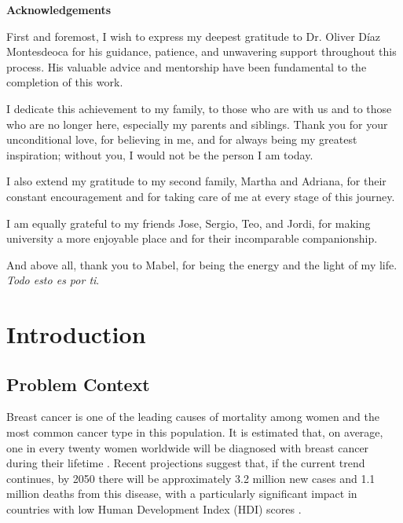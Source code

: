 \documentclass[a4paper,10pt]{book}
\begin{document}
\newpage
{}
\noindent \textbf{\large Acknowledgements}

First and foremost, I wish to express my deepest gratitude to Dr. Oliver Díaz Montesdeoca for his guidance, patience, and unwavering support throughout this process. His valuable advice and mentorship have been fundamental to the completion of this work.

I dedicate this achievement to my family, to those who are with us and to those who are no longer here, especially my parents and siblings. Thank you for your unconditional love, for believing in me, and for always being my greatest inspiration; without you, I would not be the person I am today.

I also extend my gratitude to my second family, Martha and Adriana, for their constant encouragement and for taking care of me at every stage of this journey.

I am equally grateful to my friends Jose, Sergio, Teo, and Jordi, for making university a more enjoyable place and for their incomparable companionship.

And above all, thank you to Mabel, for being the energy and the light of my life. \textit{Todo esto es por ti}.
 \setcounter{page}{0}
\let\cleardoublepage\clearpage
\tableofcontents
\newpage \thispagestyle{empty}

\listoffigures
\listoftables


\pagestyle{fancy}
\newpage \thispagestyle{empty}
\mainmatter
\chapter{Introduction}
\section{Problem Context}

Breast cancer is one of the leading causes of mortality among women and the most common cancer type in this population. It is estimated that, on average, one in every twenty women worldwide will be diagnosed with breast cancer during their lifetime \cite{kim_global_2025}. Recent projections suggest that, if the current trend continues, by 2050 there will be approximately 3.2 million new cases and 1.1 million deaths from this disease, with a particularly significant impact in countries with low Human Development Index (HDI) scores \cite{kim_global_2025}.
\end{document}
